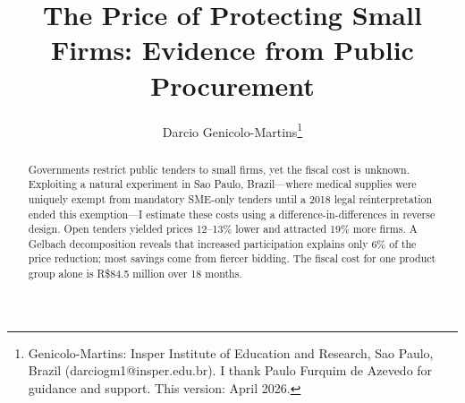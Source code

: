 \documentclass[AEJ]{AEA}
\begin{document}
\title{The Price of Protecting Small Firms: Evidence from Public Procurement}
\author{Darcio Genicolo-Martins\thanks{%
Genicolo-Martins: Insper Institute of Education and Research, Sao Paulo, Brazil
(darciogm1@insper.edu.br). I thank Paulo Furquim de Azevedo for guidance and support.
This version: April 2026.}}
\date{}
\pubMonth{}
\pubYear{}
\pubVolume{}
\pubIssue{}

\begin{abstract}
Governments restrict public tenders to small firms, yet the fiscal cost is unknown. Exploiting a natural experiment in Sao Paulo, Brazil---where medical supplies were uniquely exempt from mandatory SME-only tenders until a 2018 legal reinterpretation ended this exemption---I estimate these costs using a difference-in-differences in reverse design. Open tenders yielded prices 12--13\% lower and attracted 19\% more firms. A Gelbach decomposition reveals that increased participation explains only 6\% of the price reduction; most savings come from fiercer bidding. The fiscal cost for one product group alone is R\$84.5 million over 18 months.
\end{abstract}

\maketitle

\newcommand{\introheading}{}











\appendix

\end{document}
